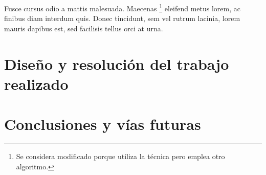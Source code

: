 Fusce cursus odio a mattis malesuada. Maecenas \footnote{Se considera modificado porque utiliza la técnica pero emplea otro algoritmo.} eleifend metus lorem, ac finibus diam interdum quis. Donec tincidunt, sem vel rutrum lacinia, lorem mauris dapibus est, sed facilisis tellus orci at urna.


\chapter{Diseño y resolución del trabajo realizado}




\chapter{Conclusiones y vías futuras}













\newpage
\cleardoublepage







